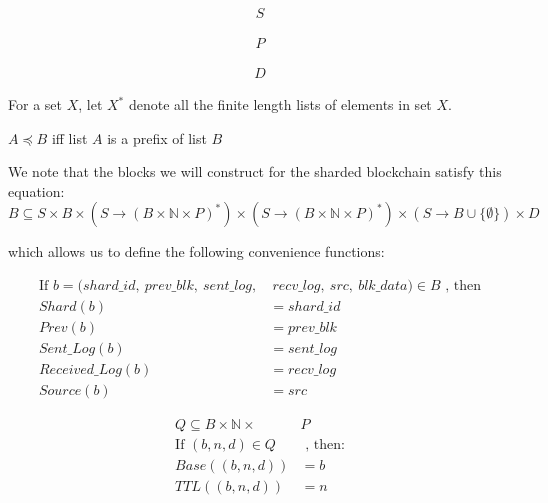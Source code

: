 \begin{defn}
\begin{align*}
  S
\end{align*}
\end{defn}

\begin{defn}
\begin{align*}
  P
\end{align*}
\end{defn}

\begin{defn}
\begin{align*}
  D
\end{align*}
\end{defn}

\begin{defn}
For a set $X$, let $X^*$ denote all the finite length lists of elements in set $X$.
\end{defn}

\begin{defn}
$A \preceq B$ iff list $A$ is a prefix of list $B$
\end{defn}

\newcommand{\Q}{B \times \mathbb{N} \times P}

We note that the blocks we will construct for the sharded blockchain satisfy this equation:
$$
B \subseteq S \times B \times (S \to (\Q)^*) \times (S \to (\Q)^*) \times (S \to B \cup \{\emptyset\}) \times D
$$

which allows us to define the following convenience functions:

\begin{defn}[Blocks $B$]
\begin{align*}
  \text{If } b = (shard\_id,~ prev\_blk, ~sent\_log,& ~recv\_log, ~src, ~blk\_data) \in B \text{ , then}\\
  Shard(b) &= shard\_id \\
  Prev(b) &= prev\_blk \\
  Sent\_Log(b) &= sent\_log \\
  Received\_Log(b) &= recv\_log \\
  Source(b) &= src
\end{align*}
\end{defn}


\begin{defn}
\begin{align*}
  Q \subseteq B \times \mathbb{N} \times& P \\
  \text{If } (b, n, d) \in Q &\text{ , then:} \\
  Base((b, n, d)) &= b \\
  TTL((b, n, d)) &= n
\end{align*}
\end{defn}

